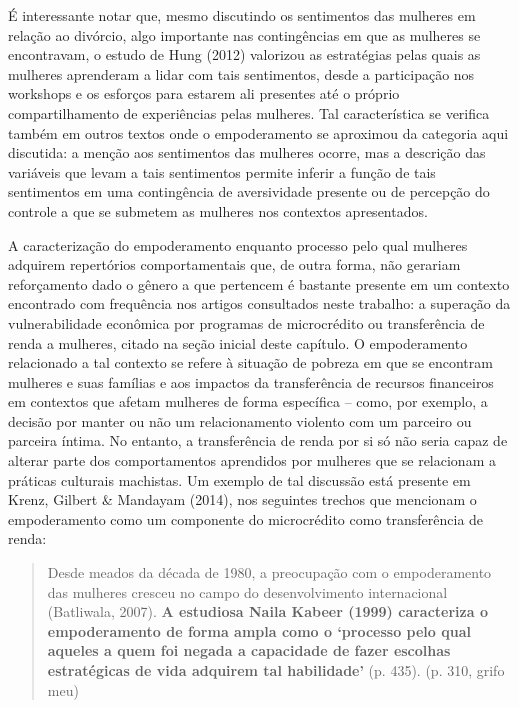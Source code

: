 É interessante notar que, mesmo discutindo os sentimentos das mulheres em relação ao divórcio, algo importante nas contingências em que as mulheres se encontravam, o estudo de Hung (2012) valorizou as estratégias pelas quais as mulheres aprenderam a lidar com tais sentimentos, desde a participação nos workshops e os esforços para estarem ali presentes até o próprio compartilhamento de experiências pelas mulheres. Tal característica se verifica também em outros textos onde o empoderamento se aproximou da categoria aqui discutida: a menção aos sentimentos das mulheres ocorre, mas a descrição das variáveis que levam a tais sentimentos permite inferir a função de tais sentimentos em uma contingência de aversividade presente ou de percepção do controle a que se submetem as mulheres nos contextos apresentados.

A caracterização do empoderamento enquanto processo pelo qual mulheres adquirem repertórios comportamentais que, de outra forma, não gerariam reforçamento dado o gênero a que pertencem é bastante presente em um contexto encontrado com frequência nos artigos consultados neste trabalho: a superação da vulnerabilidade econômica por programas de microcrédito ou transferência de renda a mulheres, citado na seção inicial deste capítulo. O empoderamento relacionado a tal contexto se refere à situação de pobreza em que se encontram mulheres e suas famílias e aos impactos da transferência de recursos financeiros em contextos que afetam mulheres de forma específica – como, por exemplo, a decisão por manter ou não um relacionamento violento com um parceiro ou parceira íntima. No entanto, a transferência de renda por si só não seria capaz de alterar parte dos comportamentos aprendidos por mulheres que se relacionam a práticas culturais machistas. Um exemplo de tal discussão está presente em Krenz, Gilbert \& Mandayam (2014), nos seguintes trechos que mencionam o empoderamento como um componente do microcrédito como transferência de renda:

\begin{quote}
    Desde meados da década de 1980, a preocupação com o empoderamento das mulheres cresceu no campo do desenvolvimento internacional (Batliwala, 2007). \textbf{A estudiosa Naila Kabeer (1999) caracteriza o empoderamento de forma ampla como o ‘processo pelo qual aqueles a quem foi negada a capacidade de fazer escolhas estratégicas de vida adquirem tal habilidade’} (p. 435). (p. 310, grifo meu)
\end{quote}

